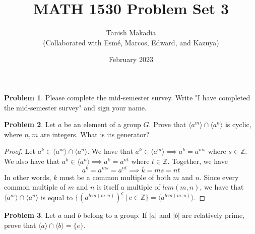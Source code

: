 \documentclass[12pt,reqno]{article}
\title{MATH 1530 Problem Set 3}
\author{Tanish Makadia\\\small{(Collaborated with Esmé, Marcos, Edward, and Kazuya)}}
\date{February 2023}
\newcommand{\Z}{\mathbb{Z}}
\theoremstyle{plain}
\theoremstyle{definition}
\newtheorem{problem}{Problem}
\begin{document}
\maketitle


\begin{problem}
    Please complete the mid-semester survey. Write "I have completed the mid-semester survey" and sign your name.
\end{problem}

\newpage


\begin{problem}
    Let \(a\) be an element of a group \(G\). Prove that \(\langle a^m\rangle \cap \langle a^n\rangle\)
    is cyclic, where \(n,m\) are integers. What is its generator?
\end{problem}

\begin{proof}
    Let \(a^k\in \langle a^m\rangle \cap \langle a^n\rangle\). We have that \(a^{k}\in\langle a^m\rangle\implies a^k=a^{ms}\) where \(s\in\Z\). 
    We also have that \(a^k\in\langle a^n\rangle\implies a^k=a^{nt}\) where \(t\in\Z\). Together, we have
    \[a^k=a^{ms}=a^{nt}\implies k=ms=nt\]
    In other words, \(k\) must be a common multiple of both \(m\) and \(n\). Since every common multiple of \(m\) and
    \(n\) is itself a multiple of \(lcm(m,n)\), we have that \(\langle a^m\rangle \cap \langle a^n\rangle\) is equal to 
    \(\{(a^{lcm(m,n)})^c\ |\ c\in\Z\}=\langle a^{lcm(m,n)}\rangle\). 
\end{proof}

\newpage


\begin{problem}
    Let \(a\) and \(b\) belong to a group. If \(|a|\) and \(|b|\) are relatively prime, prove that \(\langle a\rangle \cap \langle b\rangle = \{e\}\).
\end{problem}
\end{document}
